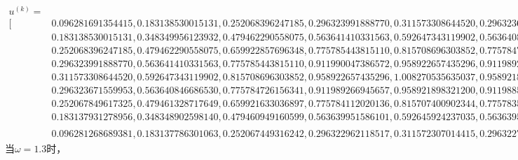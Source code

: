 \documentclass[10pt,a4paper]{article}
\begin{document}
\begin{align*}
u^{(k)}=&\\
[&0.096281691354415,0.183138530015131,0.252068396247185,0.296323991888770,0.311573308644520,0.296323671559953,0.252067849617325,0.183137931278956,0.096281268689381,\\
&0.183138530015131,0.348349956123932,0.479462290558075,0.563641410331563,0.592647343119902,0.563640846686530,0.479461328717649,0.348348902598140,0.183137786301063,\\
&0.252068396247185,0.479462290558075,0.659922857696348,0.775785443815110,0.815708696303852,0.775784726156341,0.659921633036897,0.479460949160599,0.252067449316242,\\
&0.296323991888770,0.563641410331563,0.775785443815110,0.911990047386572,0.958922657435296,0.911989266945657,0.775784112020136,0.563639951586101,0.296322962118517,\\
&0.311573308644520,0.592647343119902,0.815708696303852,0.958922657435296,1.008270535635037,0.958921898321200,0.815707400902344,0.592645924237035,0.311572307014415,\\
&0.296323671559953,0.563640846686530,0.775784726156341,0.911989266945657,0.958921898321200,0.911988599083657,0.775783586473327,0.563639598365687,0.296322790334472,\\
&0.252067849617325,0.479461328717649,0.659921633036897,0.775784112020136,0.815707400902344,0.775783586473327,0.659920736209750,0.479460346402385,0.252067156172811,\\
&0.183137931278956,0.348348902598140,0.479460949160599,0.563639951586101,0.592645924237035,0.563639598365687,0.479460346402385,0.348348242383297,0.183137465214366,\\
&0.096281268689381,0.183137786301063,0.252067449316242,0.296322962118517,0.311572307014415,0.296322790334472,0.252067156172811,0.183137465214366,0.096281042025073]^T
\end{align*}
\normalsize
当$\omega=1.3$时，
\tiny
\end{document}
